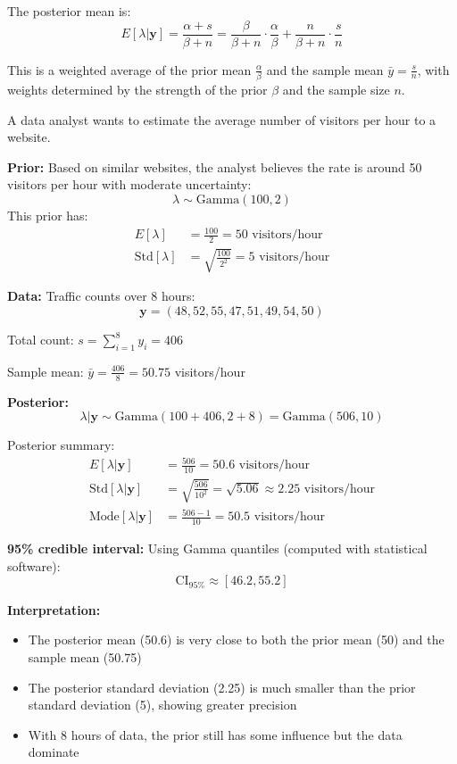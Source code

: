 \begin{examplebox}
\begin{example}
The posterior mean is:
$$E[\lambda|\mathbf{y}] = \frac{\alpha + s}{\beta + n} = \frac{\beta}{\beta + n} \cdot \frac{\alpha}{\beta} + \frac{n}{\beta + n} \cdot \frac{s}{n}$$

This is a weighted average of the prior mean $\frac{\alpha}{\beta}$ and the sample mean $\bar{y} = \frac{s}{n}$, with weights determined by the strength of the prior $\beta$ and the sample size $n$.

\end{example}
\end{examplebox}

\begin{examplebox}
\begin{example}
A data analyst wants to estimate the average number of visitors per hour to a website.

\textbf{Prior:} Based on similar websites, the analyst believes the rate is around 50 visitors per hour with moderate uncertainty:
$$\lambda \sim \text{Gamma}(100, 2)$$
This prior has:
\begin{align*}
E[\lambda] &= \frac{100}{2} = 50 \text{ visitors/hour} \\
\text{Std}[\lambda] &= \sqrt{\frac{100}{2^2}} = 5 \text{ visitors/hour}
\end{align*}

\textbf{Data:} Traffic counts over 8 hours:
$$\mathbf{y} = (48, 52, 55, 47, 51, 49, 54, 50)$$

Total count: $s = \sum_{i=1}^8 y_i = 406$

Sample mean: $\bar{y} = \frac{406}{8} = 50.75$ visitors/hour

\textbf{Posterior:}
$$\lambda|\mathbf{y} \sim \text{Gamma}(100 + 406, 2 + 8) = \text{Gamma}(506, 10)$$

Posterior summary:
\begin{align*}
E[\lambda|\mathbf{y}] &= \frac{506}{10} = 50.6 \text{ visitors/hour} \\
\text{Std}[\lambda|\mathbf{y}] &= \sqrt{\frac{506}{10^2}} = \sqrt{5.06} \approx 2.25 \text{ visitors/hour} \\
\text{Mode}[\lambda|\mathbf{y}] &= \frac{506-1}{10} = 50.5 \text{ visitors/hour}
\end{align*}

\textbf{95\% credible interval:}
Using Gamma quantiles (computed with statistical software):
$$\text{CI}_{95\%} \approx [46.2, 55.2]$$

\textbf{Interpretation:}
\begin{itemize}
\item The posterior mean (50.6) is very close to both the prior mean (50) and the sample mean (50.75)
\item The posterior standard deviation (2.25) is much smaller than the prior standard deviation (5), showing greater precision
\item With 8 hours of data, the prior still has some influence but the data dominate
\end{itemize}


\end{example}
\end{examplebox}
